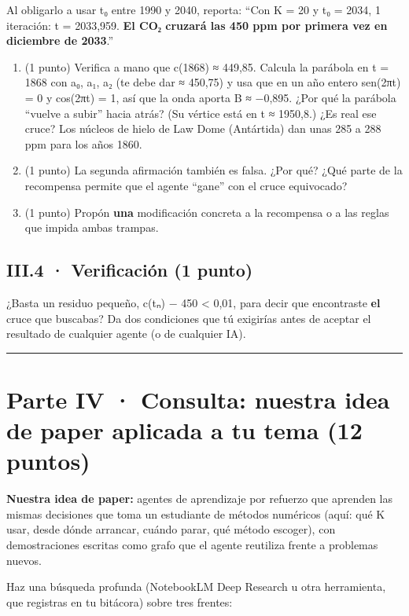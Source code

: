 Al obligarlo a usar t₀ entre 1990 y 2040, reporta: ``Con K = 20 y t₀ = 2034, 1 iteración: t = 2033,959. \textbf{El CO₂ cruzará las 450 ppm por primera vez en diciembre de 2033}.''

\begin{enumerate}
\def\labelenumi{(\alph{enumi})}
\item
  (1 punto) Verifica a mano que c(1868) ≈ 449,85. Calcula la parábola en t = 1868 con a₀, a₁, a₂ (te debe dar ≈ 450,75) y usa que en un año entero sen(2πt) = 0 y cos(2πt) = 1, así que la onda aporta B ≈ −0,895. ¿Por qué la parábola ``vuelve a subir'' hacia atrás? (Su vértice está en t ≈ 1950,8.) ¿Es real ese cruce? Los núcleos de hielo de Law Dome (Antártida) dan unas 285 a 288 ppm para los años 1860.
\item
  (1 punto) La segunda afirmación también es falsa. ¿Por qué? ¿Qué parte de la recompensa permite que el agente ``gane'' con el cruce equivocado?
\item
  (1 punto) Propón \textbf{una} modificación concreta a la recompensa o a las reglas que impida ambas trampas.
\end{enumerate}

\subsection{III.4 · Verificación (1 punto)}

¿Basta un residuo pequeño, \textbar c(tₙ) − 450\textbar{} \textless{} 0,01, para decir que encontraste \textbf{el} cruce que buscabas? Da dos condiciones que tú exigirías antes de aceptar el resultado de cualquier agente (o de cualquier IA).

\begin{center}\rule{0.5\linewidth}{0.5pt}\end{center}

\section{Parte IV · Consulta: nuestra idea de paper aplicada a tu tema (12 puntos)}

\textbf{Nuestra idea de paper:} agentes de aprendizaje por refuerzo que aprenden las mismas decisiones que toma un estudiante de métodos numéricos (aquí: qué K usar, desde dónde arrancar, cuándo parar, qué método escoger), con demostraciones escritas como grafo que el agente reutiliza frente a problemas nuevos.

Haz una búsqueda profunda (NotebookLM Deep Research u otra herramienta, que registras en tu bitácora) sobre tres frentes:

